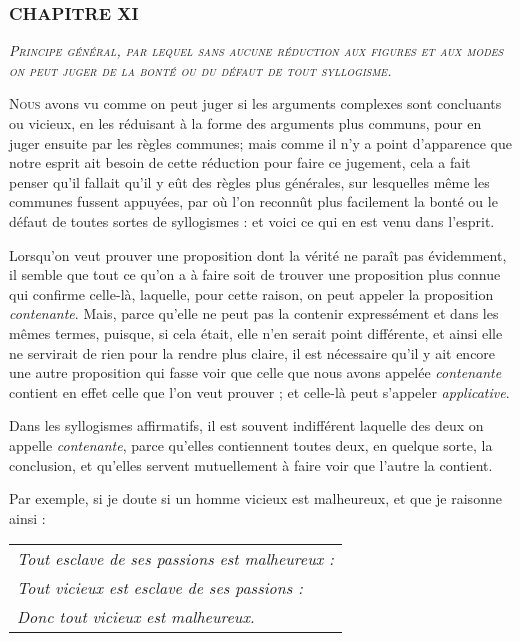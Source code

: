 \subsubsection{\centering \Large CHAPITRE XI}
\begin{center}\emph{\large\scshape Principe général, par lequel sans aucune réduction aux figures et aux modes on peut juger de la bonté ou du défaut de tout syllogisme.}\end{center}

	\lettrine{N}{ous} avons vu comme on peut juger si les arguments complexes sont concluants ou vicieux, en les réduisant à la forme des arguments plus communs, pour en juger ensuite par les règles communes; mais comme il n'y a point d'apparence que notre esprit ait besoin de cette réduction pour faire ce jugement, cela a fait penser qu'il fallait qu'il y eût des règles plus générales, sur lesquelles même les communes fussent appuyées, par où l'on reconnût plus facilement la bonté ou le défaut de toutes sortes de syllogismes : et voici ce qui en est venu dans l'esprit.

Lorsqu'on veut prouver une proposition dont la vérité ne paraît pas évidemment, il semble que tout ce qu'on a à faire soit de trouver une proposition plus connue qui confirme celle-là, laquelle, pour cette raison, on peut appeler la proposition \emph{contenante}. Mais, parce qu'elle ne peut pas la contenir expressément et dans les mêmes termes, puisque, si cela était, elle n'en serait point différente, et ainsi elle ne servirait de rien pour la rendre plus claire, il est nécessaire qu'il y ait encore une autre proposition qui fasse voir que celle que nous avons appelée \emph{contenante} contient en effet celle que l'on veut prouver ; et celle-là peut s'appeler \emph{applicative}.

Dans les syllogismes affirmatifs, il est souvent indifférent laquelle des deux on appelle \emph{contenante}, parce qu'elles contiennent toutes deux, en quelque sorte, la conclusion, et qu'elles servent mutuellement à faire voir que l'autre la contient.

Par exemple, si je doute si un homme vicieux est malheureux, et que je raisonne ainsi :

\begin{center}
	\begin{tabular}{l}
		\emph{Tout esclave de ses passions est malheureux :} \\
		\emph{Tout vicieux est esclave de ses passions :} \\
		\emph{Donc tout vicieux est malheureux.} \\
	\end{tabular}
\end{center}

